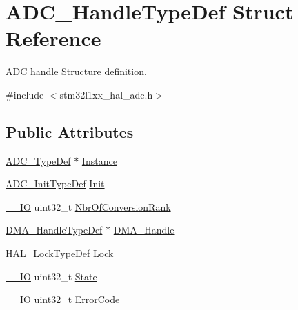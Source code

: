 \hypertarget{struct_a_d_c___handle_type_def}{\section{A\-D\-C\-\_\-\-Handle\-Type\-Def Struct Reference}
\label{struct_a_d_c___handle_type_def}
}


A\-D\-C handle Structure definition.  




{\ttfamily \#include $<$stm32l1xx\-\_\-hal\-\_\-adc.\-h$>$}

\subsection*{Public Attributes}
\begin{DoxyCompactItemize}
\item 
\hyperlink{struct_a_d_c___type_def}{A\-D\-C\-\_\-\-Type\-Def} $\ast$ \hyperlink{struct_a_d_c___handle_type_def_a3d89e51782aec71f9cfdff63f943d785}{Instance}
\item 
\hyperlink{struct_a_d_c___init_type_def}{A\-D\-C\-\_\-\-Init\-Type\-Def} \hyperlink{struct_a_d_c___handle_type_def_a43986a9a8ff67bdb398c01db82fda605}{Init}
\item 
\hyperlink{core__sc300_8h_aec43007d9998a0a0e01faede4133d6be}{\-\_\-\-\_\-\-I\-O} uint32\-\_\-t \hyperlink{struct_a_d_c___handle_type_def_a2abb5b84e713270bafebe5752bcb91c9}{Nbr\-Of\-Conversion\-Rank}
\item 
\hyperlink{group___d_m_a___exported___types_ga92b907d56a9c29b93d46782a7a04f91e}{D\-M\-A\-\_\-\-Handle\-Type\-Def} $\ast$ \hyperlink{struct_a_d_c___handle_type_def_a1983db16acacd5f0b2881e43010dcd72}{D\-M\-A\-\_\-\-Handle}
\item 
\hyperlink{stm32l1xx__hal__def_8h_ab367482e943333a1299294eadaad284b}{H\-A\-L\-\_\-\-Lock\-Type\-Def} \hyperlink{struct_a_d_c___handle_type_def_a7ef248e63b28b67cd985bafaeffd68ba}{Lock}
\item 
\hyperlink{core__sc300_8h_aec43007d9998a0a0e01faede4133d6be}{\-\_\-\-\_\-\-I\-O} uint32\-\_\-t \hyperlink{struct_a_d_c___handle_type_def_abd63d2ae2064ef230986a43ae48f3df8}{State}
\item 
\hyperlink{core__sc300_8h_aec43007d9998a0a0e01faede4133d6be}{\-\_\-\-\_\-\-I\-O} uint32\-\_\-t \hyperlink{struct_a_d_c___handle_type_def_a576634bdfdae8c61203a232876d2ba72}{Error\-Code}
\end{DoxyCompactItemize}


